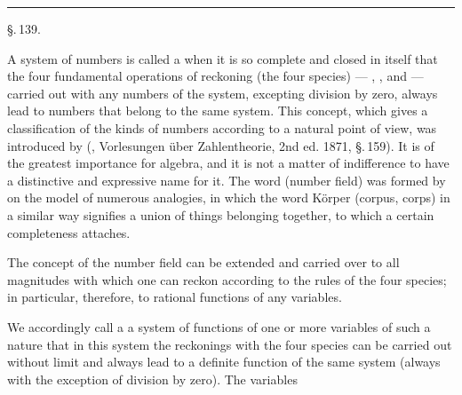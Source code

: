 
\begin{center}

\end{center}

\begin{center}
\rule{3cm}{0.4pt}
\end{center}

\begin{center}
\S.\,139.

\end{center}

A system of numbers is called a  when it is so complete and closed in itself that the four fundamental operations of reckoning (the four species) — , ,  and  — carried out with any numbers of the system, excepting division by zero, always lead to numbers that belong to the same system. This concept, which gives a classification of the kinds of numbers according to a natural point of view, was introduced by  (, Vorlesungen \"uber Zahlentheorie, 2nd ed. 1871, \S.\,159). It is of the greatest importance for algebra, and it is not a matter of indifference to have a distinctive and expressive name for it. The word  (number field) was formed by  on the model of numerous analogies, in which the word K\"orper (corpus, corps) in a similar way signifies a union of things belonging together, to which a certain completeness attaches.

The concept of the number field can be extended and carried over to all magnitudes with which one can reckon according to the rules of the four species; in particular, therefore, to rational functions of any variables.

We accordingly call a  a system of functions of one or more variables of such a nature that in this system the reckonings with the four species can be carried out without limit and always lead to a definite function of the same system (always with the exception of division by zero). The variables

